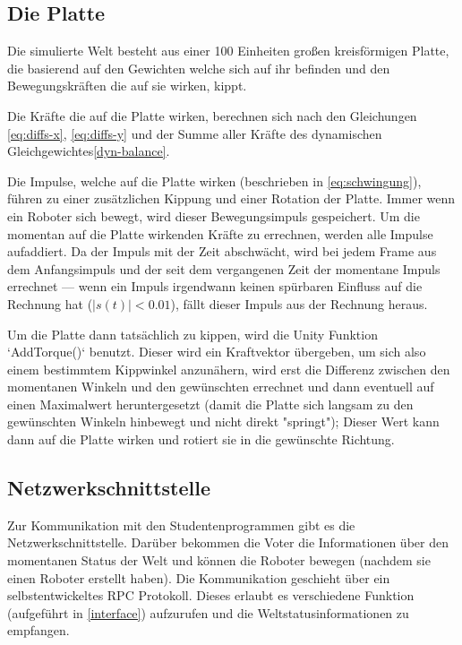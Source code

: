 \subsection{Die Platte}\label{plate}
Die simulierte Welt besteht aus einer 100 Einheiten gro{\ss}en kreisf{\"{o}}rmigen Platte, die basierend auf den Gewichten welche sich auf ihr befinden und
den Bewegungskr{\"{a}}ften die auf sie wirken, kippt.

Die Kr{\"{a}}fte die auf die Platte wirken, berechnen sich nach den Gleichungen \ref{eq:diffs-x}, \ref{eq:diffs-y} und der Summe aller Kr{\"{a}}fte des
dynamischen Gleichgewichtes\ref{dyn-balance}.

Die Impulse, welche auf die Platte wirken (beschrieben in \ref{eq:schwingung}), f{\"{u}}hren zu einer zus{\"{a}}tzlichen Kippung und einer Rotation der Platte.
Immer wenn ein Roboter sich bewegt, wird dieser Bewegungsimpuls gespeichert. Um die momentan auf die Platte wirkenden Kr{\"{a}}fte zu errechnen, werden alle
Impulse aufaddiert. Da der Impuls mit der Zeit abschw{\"{a}}cht, wird bei jedem Frame aus dem Anfangsimpuls und der seit dem vergangenen Zeit der momentane
Impuls errechnet --- wenn ein Impuls irgendwann keinen sp{\"{u}}rbaren Einfluss auf die Rechnung hat ($ |s(t)| < 0.01$), f{\"{a}}llt dieser Impuls aus der
Rechnung heraus.

Um die Platte dann tats{\"{a}}chlich zu kippen, wird die Unity Funktion `AddTorque()` benutzt. Dieser wird ein Kraftvektor {\"{u}}bergeben, um sich also einem
bestimmtem Kippwinkel anzun{\"{a}}hern, wird erst die Differenz zwischen den momentanen Winkeln und den gew{\"{u}}nschten errechnet und dann eventuell auf
einen Maximalwert heruntergesetzt (damit die Platte sich langsam zu den gew{\"{u}}nschten Winkeln hinbewegt und nicht direkt "springt"); Dieser Wert kann dann
auf die Platte wirken und rotiert sie in die gew{\"{u}}nschte Richtung.

\subsection{Netzwerkschnittstelle}
Zur Kommunikation mit den Studentenprogrammen gibt es die Netzwerkschnittstelle. Dar{\"{u}}ber bekommen die Voter die Informationen {\"{u}}ber den momentanen
Status der Welt und k{\"{o}}nnen die Roboter bewegen (nachdem sie einen Roboter erstellt haben). Die Kommunikation geschieht {\"{u}}ber ein selbstentwickeltes
RPC Protokoll. Dieses erlaubt es verschiedene Funktion (aufgef{\"{u}}hrt in \ref{interface}) aufzurufen und die Weltstatusinformationen zu empfangen.

